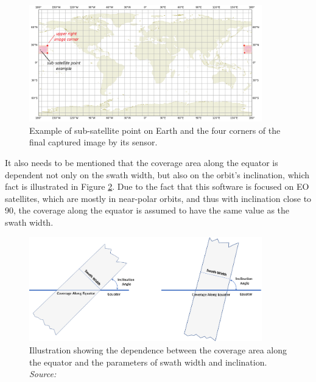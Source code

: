 \begin{figure}
\centering
\includegraphics[width=0.9\textwidth]{Images/correct_calculation.png}\caption{Example of sub-satellite point on Earth and the four corners of the final captured image by its sensor.}
\label{correct_calculation}
\end{figure}

It also needs to be mentioned that the coverage area along the equator is dependent not only on the swath width, but also on the orbit's inclination, which fact is illustrated in Figure \ref{swath_width_groundtrack}. Due to the fact that this software is focused on EO satellites, which are mostly in near-polar orbits, and thus with inclination close to 90, the coverage along the equator is assumed to have the same value as the swath width.

\begin{figure}
\centering
\includegraphics[width=0.9\textwidth]{Images/swath_width_groundtrack.png}\caption{Illustration showing the dependence between the coverage area along the equator and the parameters of swath width and inclination. \textit{Source: \cite{Elachi}}}
\label{swath_width_groundtrack}
\end{figure}

\bigskip
